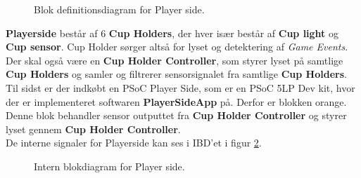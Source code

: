 \documentclass[Rapport/Rapport_main.tex]{subfiles}
\begin{document}
\begin{figure}[H]
    \centering
    \caption{Blok definitionsdiagram for Player side.}
    \label{fig:rap_playerside_hardware_bdd}
\end{figure}
\textbf{Playerside} består af 6 \textbf{Cup Holders}, der hver især består af \textbf{Cup light} og \textbf{Cup sensor}. Cup Holder sørger altså for lyset og detektering af \textit{Game Events}.\\ 
Der skal også være en \textbf{Cup Holder Controller}, som styrer lyset på samtlige \textbf{Cup Holders} og samler og filtrerer sensorsignalet fra samtlige \textbf{Cup Holders}. \\ 
Til sidst er der indkøbt en PSoC Player Side, som er en PSoC 5LP Dev kit\cite{psoc5lp}, hvor der er implementeret softwaren \textbf{PlayerSideApp} på. Derfor er blokken orange. Denne blok behandler sensor outputtet fra \textbf{Cup Holder Controller} og styrer lyset gennem \textbf{Cup Holder Controller}.\\
De interne signaler for Playerside kan ses i IBD'et i figur \ref{fig:rap_playerside_hardware_ibd}.
\begin{figure}[H]
    \centering
    \caption{Intern blokdiagram for Player side.}
    \label{fig:rap_playerside_hardware_ibd}
\end{figure}
\end{document}
